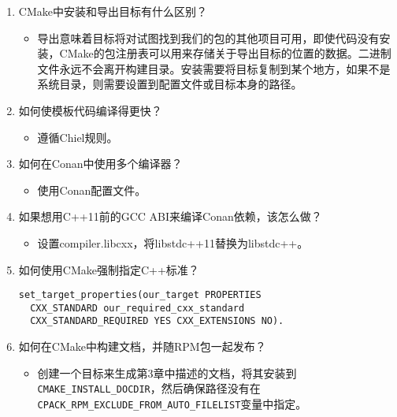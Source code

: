 \begin{enumerate}
\item
CMake中安装和导出目标有什么区别？
\begin{itemize}
\item 
导出意味着目标将对试图找到我们的包的其他项目可用，即使代码没有安装，CMake的包注册表可以用来存储关于导出目标的位置的数据。二进制文件永远不会离开构建目录。安装需要将目标复制到某个地方，如果不是系统目录，则需要设置到配置文件或目标本身的路径。
\end{itemize}

\item
如何使模板代码编译得更快？
\begin{itemize}
\item 
遵循Chiel规则。
\end{itemize}

\item
如何在Conan中使用多个编译器？
\begin{itemize}
\item 
使用Conan配置文件。
\end{itemize}

\item
如果想用C++11前的GCC ABI来编译Conan依赖，该怎么做？
\begin{itemize}
\item 
设置compiler.libcxx，将libstdc++11替换为libstdc++。
\end{itemize}

\item
如何使用CMake强制指定C++标准？

\begin{lstlisting}[style=styleCMake]
set_target_properties(our_target PROPERTIES
  CXX_STANDARD our_required_cxx_standard
  CXX_STANDARD_REQUIRED YES CXX_EXTENSIONS NO).
\end{lstlisting}

\item
如何在CMake中构建文档，并随RPM包一起发布？
\begin{itemize}
\item 
创建一个目标来生成第3章中描述的文档，将其安装到\texttt{CMAKE\_INSTALL\_DOCDIR}，然后确保路径没有在\texttt{CPACK\_RPM\_EXCLUDE\_FROM\_AUTO\_FILELIST}变量中指定。
\end{itemize}
\end{enumerate}
